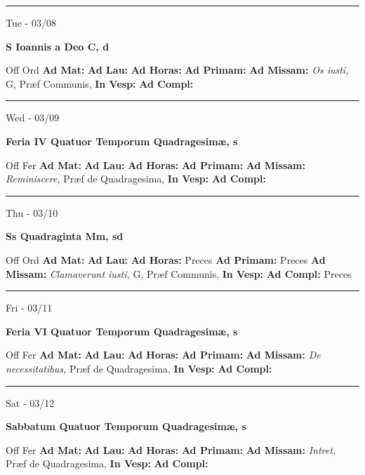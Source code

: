 \documentclass[letterpaper, 10pt]{article}
\begin{document}
\hrule
\begin{center}
Tue - 03/08
\end{center}\textbf{ \large S Ioannis a Deo C, \textnormal{\normalsize d}}
\begin{justify}
Off Ord
\textbf{Ad Mat: }
\textbf{Ad Lau: }
\textbf{Ad Horas: }
\textbf{Ad Primam: }
\textbf{Ad Missam:} \textit{Os iusti, } G, Præf Communis, 
\textbf{In Vesp: }
\textbf{Ad Compl: }\end{justify}



\hrule
\begin{center}
Wed - 03/09
\end{center}\textbf{ \large Feria IV Quatuor Temporum Quadragesimæ, \textnormal{\normalsize s}}
\begin{justify}
Off Fer
\textbf{Ad Mat: }
\textbf{Ad Lau: }
\textbf{Ad Horas: }
\textbf{Ad Primam: }
\textbf{Ad Missam:} \textit{Reminiscere, } Præf de Quadragesima, 
\textbf{In Vesp: }
\textbf{Ad Compl: }\end{justify}



\hrule
\begin{center}
Thu - 03/10
\end{center}\textbf{ \large Ss Quadraginta Mm, \textnormal{\normalsize sd}}
\begin{justify}
Off Ord
\textbf{Ad Mat: }
\textbf{Ad Lau: }
\textbf{Ad Horas: }Preces
\textbf{Ad Primam: }Preces
\textbf{Ad Missam:} \textit{Clamaverunt iusti, } G, Præf Communis, 
\textbf{In Vesp: }
\textbf{Ad Compl: }Preces\end{justify}



\hrule
\begin{center}
Fri - 03/11
\end{center}\textbf{ \large Feria VI Quatuor Temporum Quadragesimæ, \textnormal{\normalsize s}}
\begin{justify}
Off Fer
\textbf{Ad Mat: }
\textbf{Ad Lau: }
\textbf{Ad Horas: }
\textbf{Ad Primam: }
\textbf{Ad Missam:} \textit{De necessitatibus, } Præf de Quadragesima, 
\textbf{In Vesp: }
\textbf{Ad Compl: }\end{justify}



\hrule
\begin{center}
Sat - 03/12
\end{center}\textbf{ \large Sabbatum Quatuor Temporum Quadragesimæ, \textnormal{\normalsize s}}
\begin{justify}
Off Fer
\textbf{Ad Mat: }
\textbf{Ad Lau: }
\textbf{Ad Horas: }
\textbf{Ad Primam: }
\textbf{Ad Missam:} \textit{Intret, } Præf de Quadragesima, 
\textbf{In Vesp: }
\textbf{Ad Compl: }\end{justify}
\end{document}
